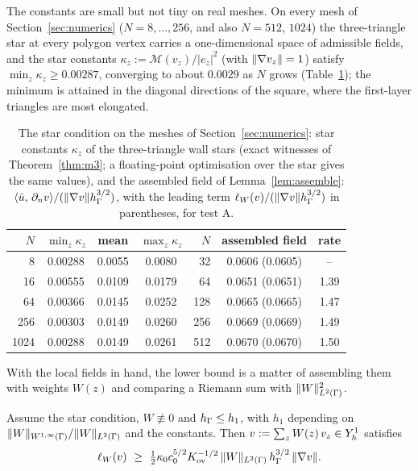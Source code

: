 The constants are small but not tiny on real meshes. On every mesh of Section~\ref{sec:numerics} ($N=8,\dots,256$, and also $N=512$, $1024$) the three-triangle star at every polygon vertex carries a one-dimensional space of admissible fields, and the star constants $\kappa_z:=\mathcal M(v_z)/|e_z|^2$ (with $\lVert \nabla v_z\rVert=1$) satisfy $\min_z\kappa_z\ge0.00287$, converging to about $0.0029$ as $N$ grows (Table~\ref{tab:stars}); the minimum is attained in the diagonal directions of the square, where the first-layer triangles are most elongated.

\begin{table}[t]
\centering\small
\caption{The star condition on the meshes of Section~\ref{sec:numerics}: star constants $\kappa_z$ of the three-triangle wall stars (exact witnesses of Theorem~\ref{thm:m3}; a floating-point optimisation over the star gives the same values), and the assembled field of Lemma~\ref{lem:assemble}: $\langle \tilde u,\, \partial_n v\rangle/(\lVert \nabla v\rVert h_\Gamma^{3/2})$, with the leading term $\ell_W(v)/(\lVert \nabla v\rVert h_\Gamma^{3/2})$ in parentheses, for test A.}\label{tab:stars}
\begin{tabular}{rccc|rcc}
\toprule
$N$ & $\min_z\kappa_z$ & mean & $\max_z\kappa_z$ & $N$ & assembled field & rate\\
\midrule
8 & 0.00288 & 0.0055 & 0.0080 & 32 & 0.0606 (0.0605) & --\\
16 & 0.00555 & 0.0109 & 0.0179 & 64 & 0.0651 (0.0651) & 1.39\\
64 & 0.00366 & 0.0145 & 0.0252 & 128 & 0.0665 (0.0665) & 1.47\\
256 & 0.00303 & 0.0149 & 0.0260 & 256 & 0.0669 (0.0669) & 1.49\\
1024 & 0.00288 & 0.0149 & 0.0261 & 512 & 0.0670 (0.0670) & 1.50\\
\bottomrule
\end{tabular}
\end{table}

With the local fields in hand, the lower bound is a matter of assembling them with weights $W(z)$ and comparing a Riemann sum with $\lVert W\rVert^2_{L^2(\Gamma)}$.

\begin{lemma}[Assembly]\label{lem:assemble}
Assume the star condition, $W\not\equiv0$ and $h_\Gamma\le h_1$, with $h_1$ depending on $\lVert W\rVert_{W^{1,\infty}(\Gamma)}/\lVert W\rVert_{L^2(\Gamma)}$ and the constants. Then $v:=\sum_zW(z)\,v_z\in Y_h^1$ satisfies
\[
\ell_W(v)\ \ge\ \tfrac12\kappa_0c_0^{5/2}K_{\mathrm{ov}}^{-1/2}\,\norm{W}_{L^2(\Gamma)}\,\hG^{3/2}\,\norm{\nabla v}.
\]
\end{lemma}


